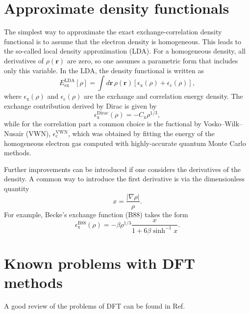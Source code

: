 \documentclass[../Main/chem532-notes.tex]{subfiles}
\begin{document}
\section{Approximate density functionals}
The simplest way to approximate the exact exchange-correlation density functional is to assume that the electron density is homogeneous.
This leads to the so-called local density approximation (LDA).
For a homogeneous density, all derivatives of $\rho(\mathbf{r})$ are zero, so one assumes a parametric form that includes only this variable.
In the LDA, the density functional is written as
\begin{equation}
E^\mathrm{LDA}_\mathrm{ex}[\rho] 
= \int d\mathbf{r} \, \rho(\mathbf{r}) [\epsilon_\mathrm{x}(\rho) + \epsilon_\mathrm{c}(\rho)],
\end{equation}
where $\epsilon_\mathrm{x}(\rho)$ and $\epsilon_\mathrm{c}(\rho)$ are the exchange and correlation energy density.
The exchange contribution derived by Dirac is given by
\begin{equation}
\epsilon^\mathrm{Dirac}_\mathrm{x}(\rho) = - C_\mathrm{x} \rho^{1/3},
\end{equation}
while for the correlation part a common choice is the fuctional by Vosko--Wilk--Nusair (VWN), $\epsilon_\mathrm{c}^\mathrm{VWN}$, which was obtained by fitting the energy of the homogeneous electron gas computed with highly-accurate quantum Monte Carlo methods.

Further improvements can be introduced if one considers the derivatives of the density. A common way to introduce the first derivative is via the dimensionless quantity
\begin{equation}
x = \frac{|\nabla\rho|}{\rho}.
\end{equation}
For example, Becke's exchange function (B88) takes the form
\begin{equation}
\epsilon^\mathrm{B88}_\mathrm{x}(\rho) = - \beta \rho^{1/3} \frac{x}{1 + 6 \beta \sinh^{-1} x}.
\end{equation}




\section{Known problems with DFT methods}
A good review of the problems of DFT can be found in Ref.~\cite{Burke:2012eg}
%
%
%
\end{document}
